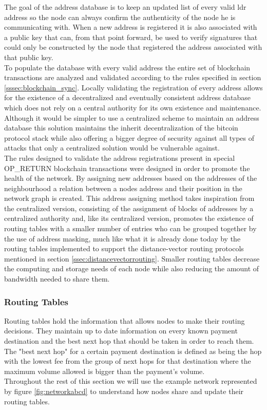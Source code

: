 The goal of the address database is to keep an updated list of every valid \acrshort{ldr} address so the node can always confirm the authenticity of the node he is communicating with. When a new address is registered it is also associated with a public key that can, from that point forward, be used to verify signatures that could only be constructed by the node that registered the address associated with that public key.\\
To populate the database with every valid address the entire set of blockchain transactions are analyzed and validated according to the rules specified in section \ref{sssec:blockchain_sync}. Locally validating the registration of every address allows for the existence of a decentralized and eventually consistent address database which does not rely on a central authority for its own existence and maintenance. Although it would be simpler to use a centralized scheme to maintain an address database this solution maintains the inherit decentralization of the bitcoin protocol stack while also offering a bigger degree of security against all types of attacks that only a centralized solution would be vulnerable against. \\
The rules designed to validate the address registrations present in special OP\_RETURN blockchain transactions were designed in order to promote the health of the network. By assigning new addresses based on the addresses of the neighbourhood a relation between a nodes address and their position in the network graph is created. This address assigning method takes inspiration from the centralized version, consisting of the assignment of blocks of addresses by a centralized authority and, like its centralized version, promotes the existence of routing tables with a smaller number of entries who can be grouped together by the use of address masking, much like what it is already done today by the routing tables implemented to support the distance-vector routing protocols mentioned in section \ref{ssec:distancevectorrouting}. Smaller routing tables decrease the computing and storage needs of each node while also reducing the amount of bandwidth needed to share them.

\subsubsection{Routing Tables}
\label{sssec:routing_tables}

Routing tables hold the information that allows nodes to make their routing decisions. They maintain up to date information on every known payment destination and the best next hop that should be taken in order to reach them. The "best next hop" for a certain payment destination is defined as being the hop with the lowest fee from the group of next hops for that destination where the maximum volume allowed is bigger than the payment's volume. \\
Throughout the rest of this section we will use the example network represented by figure \ref{fig:networkabcd} to understand how nodes share and update their routing tables.\\

